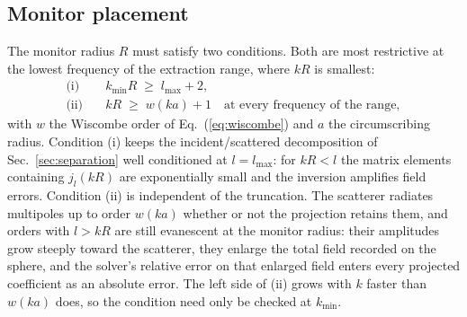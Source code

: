 \documentclass[11pt]{article}
\begin{document}
\subsection{Monitor placement}
\label{sec:monitorplacement}
The monitor radius $R$ must satisfy two conditions.  Both are most
restrictive at the lowest frequency of the extraction range, where $kR$
is smallest:
\begin{align}
\text{(i)}\quad
 & k_{\min} R \;\ge\; l_{\max} + 2,
\label{eq:critcond}\\
\text{(ii)}\quad
 & k R \;\ge\; w\!\left(k a\right) + 1 \quad \text{at every frequency of
 the range},
\label{eq:critnear}
\end{align}
with $w$ the Wiscombe order of Eq.~(\ref{eq:wiscombe}) and $a$ the
circumscribing radius.  Condition (i) keeps the incident/scattered
decomposition of Sec.~\ref{sec:separation} well conditioned at
$l = l_{\max}$: for $kR < l$ the matrix elements containing $j_l(kR)$
are exponentially small and the inversion amplifies field errors.
Condition (ii) is independent of the truncation.  The scatterer
radiates multipoles up to order $w(ka)$ whether or not the projection
retains them, and orders with $l > kR$ are still evanescent at the
monitor radius: their amplitudes grow steeply toward the scatterer,
they enlarge the total field recorded on the sphere, and the solver's
relative error on that enlarged field enters every projected
coefficient as an absolute error.  The left side of (ii) grows with
$k$ faster than $w(ka)$ does, so the condition need only be checked at
$k_{\min}$.
\end{document}

